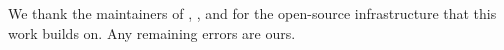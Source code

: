 We thank the maintainers of , , and  for the open-source infrastructure that this work builds on. Any remaining errors are ours.
